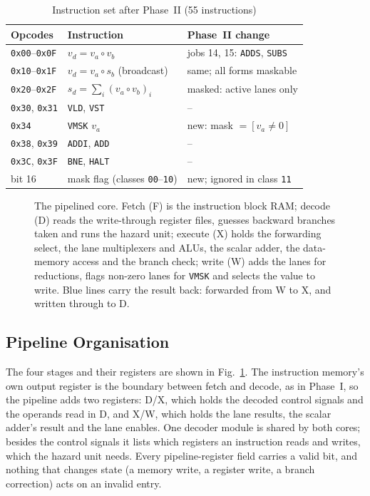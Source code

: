 \begin{table}[t]
\centering
\caption{Instruction set after Phase~II (55 instructions)}
\label{tab:isa2}
\footnotesize
\begin{tabular}{@{}lll@{}}
\toprule
Opcodes & Instruction & Phase~II change \\
\midrule
\texttt{0x00}--\texttt{0x0F} & $v_d = v_a \circ v_b$ & jobs 14, 15: \texttt{ADDS}, \texttt{SUBS} \\
\texttt{0x10}--\texttt{0x1F} & $v_d = v_a \circ s_b$ (broadcast) & same; all forms maskable \\
\texttt{0x20}--\texttt{0x2F} & $s_d = \sum_i (v_a \circ v_b)_i$ & masked: active lanes only \\
\texttt{0x30}, \texttt{0x31} & \texttt{VLD}, \texttt{VST} & -- \\
\texttt{0x34} & \texttt{VMSK} $v_a$ & new: mask $= [v_a \neq 0]$ \\
\texttt{0x38}, \texttt{0x39} & \texttt{ADDI}, \texttt{ADD} & -- \\
\texttt{0x3C}, \texttt{0x3F} & \texttt{BNE}, \texttt{HALT} & -- \\
\midrule
bit 16 & mask flag (classes \texttt{00}--\texttt{10}) & new; ignored in class \texttt{11} \\
\bottomrule
\end{tabular}
\end{table}

\begin{figure}[t]
\centering

\caption{The pipelined core. Fetch (F) is the instruction block RAM; decode (D) reads
the write-through register files, guesses backward branches taken and runs the hazard
unit; execute (X) holds the forwarding select, the lane multiplexers and ALUs, the
scalar adder, the data-memory access and the branch check; write (W) adds the lanes for
reductions, flags non-zero lanes for \texttt{VMSK} and selects the value to write. Blue
lines carry the result back: forwarded from W to X, and written through to D.}
\label{fig:pipe}
\end{figure}

\subsection{Pipeline Organisation}\label{sec:pipe}
The four stages and their registers are shown in Fig.~\ref{fig:pipe}. The instruction
memory's own output register is the boundary between fetch and decode, as in Phase~I,
so the pipeline adds two registers: D/X, which holds the decoded control signals and the
operands read in D, and X/W, which holds the lane results, the scalar adder's result and
the lane enables. One decoder module is shared by both cores; besides the control
signals it lists which registers an instruction reads and writes, which the hazard unit
needs. Every pipeline-register field carries a valid bit, and nothing that changes
state (a memory write, a register write, a branch correction) acts on an invalid entry.

